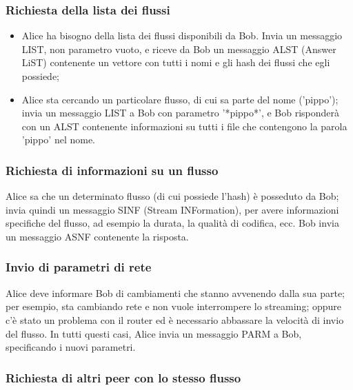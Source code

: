 \subsubsection{Richiesta della lista dei flussi}
%

\begin{itemize}
\item Alice ha bisogno della lista dei flussi disponibili da Bob. Invia un messaggio LIST, non parametro vuoto, e riceve da Bob un messaggio ALST (Answer LiST) contenente un vettore con tutti i nomi e gli hash dei flussi che egli possiede;
\item Alice sta cercando un particolare flusso, di cui sa parte del nome
('pippo'); invia un messaggio LIST a Bob con parametro '*pippo*', e Bob
risponderà con un ALST contenente informazioni su tutti i file che contengono la
parola 'pippo' nel nome.
\end{itemize}




\subsubsection{Richiesta di informazioni su un flusso}
%

Alice sa che un determinato flusso (di cui possiede l'hash) è posseduto da Bob;
invia quindi un messaggio SINF (Stream INFormation), per avere informazioni
specifiche del flusso, ad esempio la durata, la qualità di codifica, ecc. Bob
invia un messaggio ASNF contenente la risposta.






\subsubsection{Invio di parametri di rete}
%

Alice deve informare Bob di cambiamenti che stanno avvenendo dalla sua parte; per
esempio, sta cambiando rete e non vuole interrompere lo streaming; oppure c'è
stato un problema con il router ed è necessario abbassare la velocità di invio
del flusso. In tutti questi casi, Alice invia un messaggio PARM a Bob,
specificando i nuovi parametri.






\subsubsection{Richiesta di altri peer con lo stesso flusso}
%

